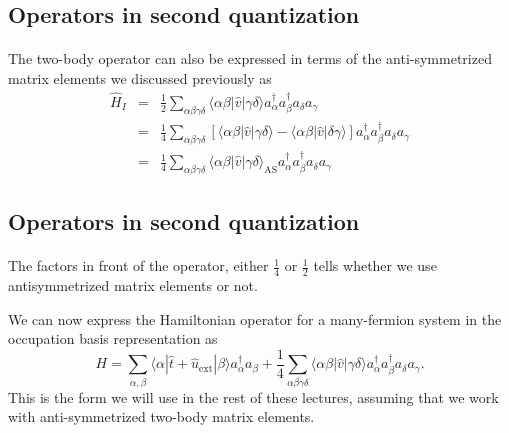 \documentclass[%
twoside,                 %
final,                   %
10pt]{article}
\begin{document}
\subsection*{Operators in second quantization}

\paragraph{}
The two-body operator can also be expressed in terms of the anti-symmetrized matrix elements we discussed previously as
\begin{eqnarray}
	\hat{H}_I &=& \frac{1}{2} \sum_{\alpha\beta\gamma\delta}  \langle \alpha \beta|\hat{v}|\gamma \delta\rangle
		a_\alpha^{\dagger} a_\beta^{\dagger} a_\delta a_\gamma \nonumber \\
	&=& \frac{1}{4} \sum_{\alpha\beta\gamma\delta} \left[ \langle \alpha \beta|\hat{v}|\gamma \delta\rangle -
		\langle \alpha \beta|\hat{v}|\delta\gamma \rangle \right] 
		a_\alpha^{\dagger} a_\beta^{\dagger} a_\delta a_\gamma \nonumber \\
	&=& \frac{1}{4} \sum_{\alpha\beta\gamma\delta} \langle \alpha \beta|\hat{v}|\gamma \delta\rangle_{\mathrm{AS}}
		a_\alpha^{\dagger} a_\beta^{\dagger} a_\delta a_\gamma \label{eq:2-45}
\end{eqnarray}




\subsection*{Operators in second quantization}

\paragraph{}
The factors in front of the operator, either  $\frac{1}{4}$ or 
$\frac{1}{2}$ tells whether we use antisymmetrized matrix elements or not. 

We can now express the Hamiltonian operator for a many-fermion system  in the occupation basis representation
as  
\begin{equation}
	H = \sum_{\alpha, \beta} \langle \alpha|\hat{t}+\hat{u}_{\mathrm{ext}}|\beta\rangle a_\alpha^{\dagger} a_\beta + \frac{1}{4} \sum_{\alpha\beta\gamma\delta}
		\langle \alpha \beta|\hat{v}|\gamma \delta\rangle a_\alpha^{\dagger} a_\beta^{\dagger} a_\delta a_\gamma. \label{eq:2-46b}
\end{equation}
This is the form we will use in the rest of these lectures, assuming that we work with anti-symmetrized two-body matrix elements.
\end{document}
